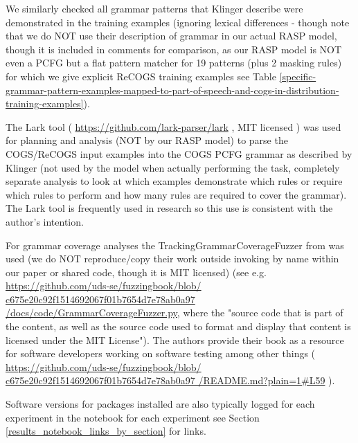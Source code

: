 \documentclass[11pt]{article}
\begin{document}
We similarly checked all grammar patterns that Klinger describe were demonstrated in the training examples  (ignoring lexical differences - though note that we do NOT use their description of grammar in our actual RASP model, though it is included in comments for comparison, as our RASP model is NOT even a PCFG but a flat pattern matcher for 19 patterns (plus 2 masking rules) for which we give explicit ReCOGS training examples see Table \ref{specific-grammar-pattern-examples-mapped-to-part-of-speech-and-cogs-in-distribution-training-examples}). 

The Lark tool ( \href{https://github.com/lark-parser/lark}{https://github.com/lark-parser/lark} , MIT licensed ) was used for planning and analysis (NOT by our RASP model) to parse the COGS/ReCOGS input examples into the COGS PCFG grammar as described by Klinger (not used by the model when actually performing the task, completely separate analysis to look at which examples demonstrate which rules or require which rules to perform and how many rules are required to cover the grammar). The Lark tool is frequently used in research so this use is consistent with the author's intention.

For grammar coverage analyses the TrackingGrammarCoverageFuzzer from \cite{fuzzingbook2023:GrammarCoverageFuzzer} was used (we do NOT reproduce/copy their work outside invoking by name within our paper or shared code, though it is MIT licensed) (see e.g. \href{https://github.com/uds-se/fuzzingbook/blob/c675e20c92f1514692067f01b7654d7e78ab0a97/docs/code/GrammarCoverageFuzzer.py}{https://github.com/uds-se/fuzzingbook/blob/
c675e20c92f1514692067f01b7654d7e78ab0a97
/docs/code/GrammarCoverageFuzzer.py}, where the "source code that is part of the content, as well as the source code used to format and display that content is licensed under the MIT License"). The authors \cite{fuzzingbook2023:GrammarCoverageFuzzer} provide their book as a resource for software developers working on software testing among other things ( \href{https://github.com/uds-se/fuzzingbook/blob/c675e20c92f1514692067f01b7654d7e78ab0a97/README.md?plain=1#L59}{https://github.com/uds-se/fuzzingbook/blob/
c675e20c92f1514692067f01b7654d7e78ab0a97
/README.md?plain=1\#L59} ).

Software versions for packages installed are also typically logged for each experiment in the notebook for each experiment see Section \ref{results_notebook_links_by_section} for links.
\end{document}
